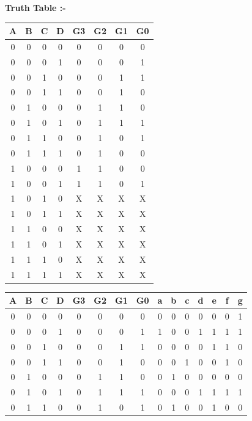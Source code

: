 \documentclass{article}
\begin{document}
\begin{multicols}{2}
\begin{center}
\begin{tableofcontents}
\newpage
\textbf{Truth Table :-}
\vspace{5MM}
\begin{tabular}{|c|c|c|c|c|c|c|c|}
\hline
\textbf{A} & {B} & {C} & {D} & {G3} & {G2} & {G1} & {G0} \\
\hline
0 & 0 & 0 & 0 & 0 & 0 & 0 & 0  \\
\hline
0 & 0 & 0 & 1 & 0 & 0 & 0 & 1 \\
\hline
0 & 0 & 1 & 0 & 0 & 0 & 1 & 1 \\
\hline
0 & 0 & 1 & 1 & 0 & 0 & 1 & 0 \\
\hline
0 & 1 & 0 & 0 & 0 & 1 & 1 & 0 \\
\hline
0 & 1 & 0 & 1 & 0 & 1 & 1 & 1 \\
\hline
0 & 1 & 1 & 0 & 0 & 1 & 0 & 1 \\
\hline 
0 & 1 & 1 & 1 & 0 & 1 & 0 & 0 \\
\hline
1 & 0 & 0 & 0 & 1 & 1 & 0 & 0 \\
\hline
1 & 0 & 0 & 1 & 1 & 1 & 0 & 1 \\
\hline
1 & 0 & 1 & 0 & {X} & {X} & {X} & {X}  \\
\hline
1 & 0 & 1 & 1 & {X} & {X} & {X} & {X} \\
\hline
1 & 1 & 0 & 0 & {X} & {X} & {X} & {X} \\
\hline
1 & 1 & 0 & 1 & {X} & {X} & {X} & {X}  \\
\hline
1 & 1 & 1 & 0 & {X} & {X} & {X} & {X} \\
\hline
1 & 1 & 1 & 1 & {X} & {X} & {X} & {X}  \\
\hline
\end{tabular}
\newline
\begin{tabular}{|c|c|c|c|c|c|c|c|c|c|c|c|c|c|c|}
\hline
{A} & {B} & {C} & {D} & {G3} & {G2} & {G1} & {G0} & {a} & {b} & {c} & {d} & {e} & {f} & {g} \\
\hline
0 & 0 & 0 & 0 & 0 & 0 & 0 & 0 & 0 & 0 & 0 & 0 & 0 & 0 & 1 \\
\hline
0 & 0 & 0 & 1 & 0 & 0 & 0 & 1 & 1 & 0 & 0 & 1 & 1 & 1 & 1 \\
\hline
0 & 0 & 1 & 0 & 0 & 0 & 1 & 1 & 0 & 0 & 0 & 0 & 1 & 1 & 0 \\
\hline
0 & 0 & 1 & 1 & 0 & 0 & 1 & 0 & 0 & 0 & 1 & 0 & 0 & 1 & 0 \\
\hline
0 & 1 & 0 & 0 & 0 & 1 & 1 & 0 & 0 & 1 & 0 & 0 & 0 & 0 & 0 \\
\hline
0 & 1 & 0 & 1 & 0 & 1 & 1 & 1 & 0 & 0 & 0 & 1 & 1 & 1 & 1 \\
\hline
0 & 1 & 1 & 0 & 0 & 1 & 0 & 1 & 0 & 1 & 0 & 0 & 1 & 0 & 0 \\

\end{tabular}
\end{tableofcontents}
\end{center}
\end{multicols}
\end{document}
